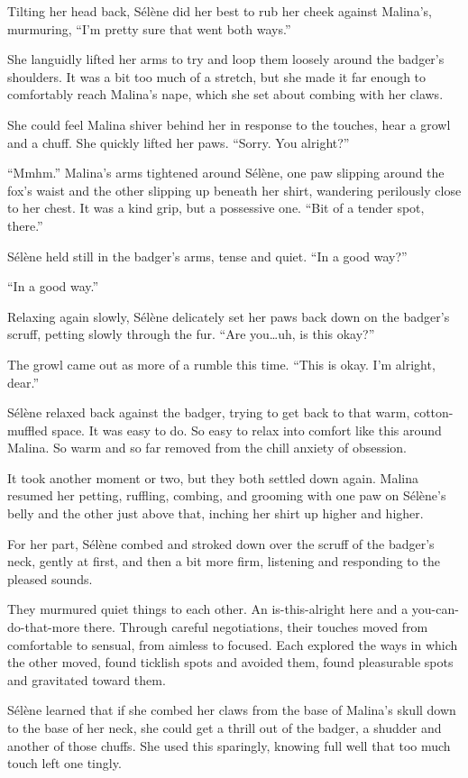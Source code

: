 Tilting her head back, Sélène did her best to rub her cheek against Malina's, murmuring, ``I'm pretty sure that went both ways.''

She languidly lifted her arms to try and loop them loosely around the badger's shoulders. It was a bit too much of a stretch, but she made it far enough to comfortably reach Malina's nape, which she set about combing with her claws.

She could feel Malina shiver behind her in response to the touches, hear a growl and a chuff. She quickly lifted her paws. ``Sorry. You alright?''

``Mmhm.'' Malina's arms tightened around Sélène, one paw slipping around the fox's waist and the other slipping up beneath her shirt, wandering perilously close to her chest. It was a kind grip, but a possessive one. ``Bit of a tender spot, there.''

Sélène held still in the badger's arms, tense and quiet. ``In a good way?''

``In a good way.''

Relaxing again slowly, Sélène delicately set her paws back down on the badger's scruff, petting slowly through the fur. ``Are you\ldots{}uh, is this okay?''

The growl came out as more of a rumble this time. ``This is okay. I'm alright, dear.''

Sélène relaxed back against the badger, trying to get back to that warm, cotton-muffled space. It was easy to do. So easy to relax into comfort like this around Malina. So warm and so far removed from the chill anxiety of obsession.

It took another moment or two, but they both settled down again. Malina resumed her petting, ruffling, combing, and grooming with one paw on Sélène's belly and the other just above that, inching her shirt up higher and higher.

For her part, Sélène combed and stroked down over the scruff of the badger's neck, gently at first, and then a bit more firm, listening and responding to the pleased sounds.

They murmured quiet things to each other. An is-this-alright here and a you-can-do-that-more there. Through careful negotiations, their touches moved from comfortable to sensual, from aimless to focused. Each explored the ways in which the other moved, found ticklish spots and avoided them, found pleasurable spots and gravitated toward them.

Sélène learned that if she combed her claws from the base of Malina's skull down to the base of her neck, she could get a thrill out of the badger, a shudder and another of those chuffs. She used this sparingly, knowing full well that too much touch left one tingly.


